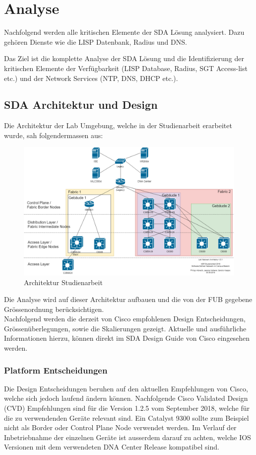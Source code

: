 \section{Analyse}
Nachfolgend werden alle kritischen Elemente der SDA Lösung analysiert. Dazu gehören Dienste wie die LISP Datenbank, Radius und DNS.  

Das Ziel ist die komplette Analyse der SDA Lösung und die Identifizierung der kritischen Elemente der Verfügbarkeit (LISP Database, Radius, SGT Access-list etc.) und der Network Services (NTP, DNS, DHCP etc.).

\subsection{SDA Architektur und Design}
Die Architektur der Lab Umgebung, welche in der Studienarbeit erarbeitet wurde, sah folgendermassen aus:

\begin{figure}[H]
	\centering
	\includegraphics[width=1\linewidth]{img/Architecture/LabNetworkArchitecture_SA}
	\caption{Architektur Studienarbeit}
	\label{fig:Architektur Studienarbeit}
\end{figure}

Die Analyse wird auf dieser Architektur aufbauen und die von der FUB gegebene Grössenordnung berücksichtigen. \\

Nachfolgend werden die derzeit von Cisco empfohlenen Design Entscheidungen, Grössen\-über\-legungen, sowie die Skalierungen gezeigt. Aktuelle und ausführliche Informationen hierzu, können direkt im SDA Design Guide von Cisco \cite{sda-designguide-sept2018} eingesehen werden.

\subsubsection{Platform Entscheidungen}
Die Design Entscheidungen beruhen auf den aktuellen Empfehlungen von Cisco, welche sich jedoch laufend ändern können. Nachfolgende Cisco Validated Design (CVD) Empfehlungen sind für die Version 1.2.5 vom September 2018, welche für die zu verwendenden Geräte relevant sind. Ein Catalyst 9300 sollte zum Beispiel nicht als Border oder Control Plane Node verwendet werden. Im Verlauf der Inbetriebnahme der einzelnen Geräte ist ausserdem darauf zu achten, welche IOS Versionen mit dem verwendeten DNA Center Release kompatibel sind.

